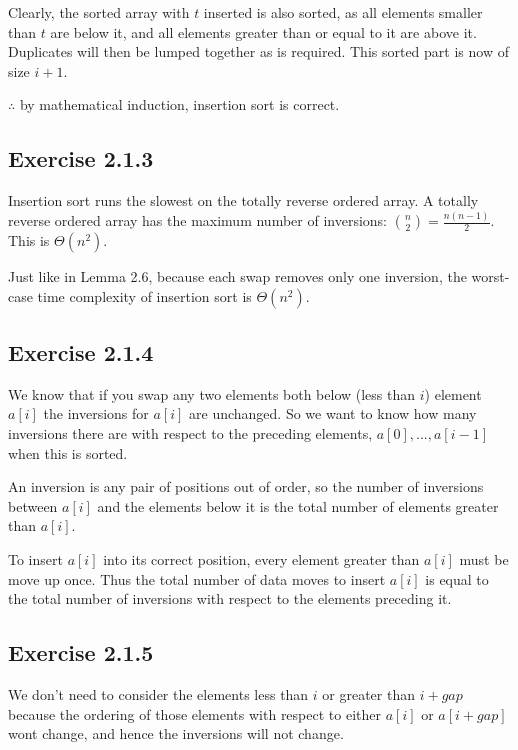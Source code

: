 \documentclass{article}
\begin{document}
Clearly, the sorted array with \(t\) inserted is also sorted, as all elements smaller than \(t\) are below it, and all elements greater than or equal to it are above it. Duplicates will then be lumped together as is required. This sorted part is now of size \(i+1\).

\(\therefore\) by mathematical induction, insertion sort is correct.



\subsection*{Exercise 2.1.3}

Insertion sort runs the slowest on the totally reverse ordered array. A totally reverse ordered array has the maximum number of inversions: \(  \binom {n} {2} = \frac{n(n-1)}{2}\). This is \(\Theta(n^2)\).

Just like in Lemma 2.6, because each swap removes only one inversion, the worst-case time complexity of insertion sort is \(\Theta(n^2)\).



\subsection*{Exercise 2.1.4}

We know that if you swap any two elements both below (less than \(i\)) element \(a[i]\) the inversions for \(a[i]\) are unchanged. So we want to know how many inversions there are with respect to the preceding elements, \(a[0],...,a[i-1]\) when this is sorted.

An inversion is any pair of positions out of order, so the number of inversions between \(a[i]\) and the elements below it is the total number of elements greater than \(a[i]\). 

To insert \(a[i]\) into its correct position, every element greater than \(a[i]\) must be move up once. Thus the total number of data moves to insert \(a[i]\) is equal to the total number of inversions with respect to the elements preceding it.



\subsection*{Exercise 2.1.5} 

We don't need to consider the elements less than \(i\) or greater than \(i+gap\) because the ordering of those elements with respect to either \(a[i]\) or \(a[i+gap]\) wont change, and hence the inversions will not change. 
\end{document}
